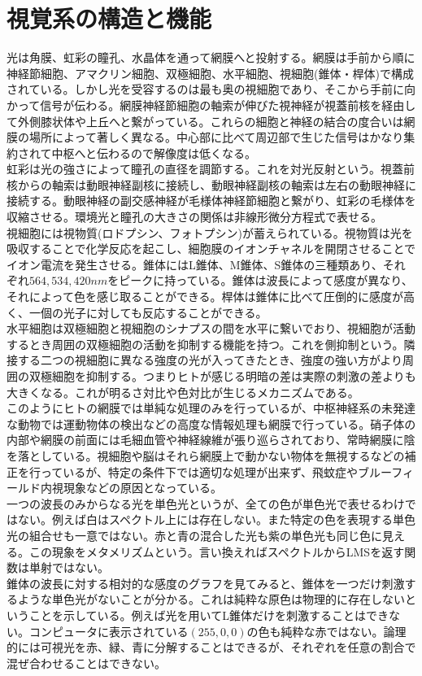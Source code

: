	\section{視覚系の構造と機能}
		光は角膜、虹彩の瞳孔、水晶体を通って網膜へと投射する。網膜は手前から順に神経節細胞、アマクリン細胞、双極細胞、水平細胞、視細胞(錐体・桿体)で構成されている。しかし光を受容するのは最も奥の視細胞であり、そこから手前に向かって信号が伝わる。網膜神経節細胞の軸索が伸びた視神経が視蓋前核を経由して外側膝状体や上丘へと繋がっている。これらの細胞と神経の結合の度合いは網膜の場所によって著しく異なる。中心部に比べて周辺部で生じた信号はかなり集約されて中枢へと伝わるので解像度は低くなる。\\
		虹彩は光の強さによって瞳孔の直径を調節する。これを対光反射という。視蓋前核からの軸索は動眼神経副核に接続し、動眼神経副核の軸索は左右の動眼神経に接続する。動眼神経の副交感神経が毛様体神経節細胞と繋がり、虹彩の毛様体を収縮させる。環境光と瞳孔の大きさの関係は非線形微分方程式で表せる。\\
		視細胞には視物質(ロドプシン、フォトプシン)が蓄えられている。視物質は光を吸収することで化学反応を起こし、細胞膜のイオンチャネルを開閉させることでイオン電流を発生させる。錐体にはL錐体、M錐体、S錐体の三種類あり、それぞれ$564, 534, 420nm$をピークに持っている。錐体は波長によって感度が異なり、それによって色を感じ取ることができる。桿体は錐体に比べて圧倒的に感度が高く、一個の光子に対しても反応することができる。\\
		水平細胞は双極細胞と視細胞のシナプスの間を水平に繋いでおり、視細胞が活動するとき周囲の双極細胞の活動を抑制する機能を持つ。これを側抑制という。隣接する二つの視細胞に異なる強度の光が入ってきたとき、強度の強い方がより周囲の双極細胞を抑制する。つまりヒトが感じる明暗の差は実際の刺激の差よりも大きくなる。これが明るさ対比や色対比が生じるメカニズムである。\\
		このようにヒトの網膜では単純な処理のみを行っているが、中枢神経系の未発達な動物では運動物体の検出などの高度な情報処理も網膜で行っている。硝子体の内部や網膜の前面には毛細血管や神経線維が張り巡らされており、常時網膜に陰を落としている。視細胞や脳はそれら網膜上で動かない物体を無視するなどの補正を行っているが、特定の条件下では適切な処理が出来ず、飛蚊症やブルーフィールド内視現象などの原因となっている。\\
		一つの波長のみからなる光を単色光というが、全ての色が単色光で表せるわけではない。例えば白はスペクトル上には存在しない。また特定の色を表現する単色光の組合せも一意ではない。赤と青の混合した光も紫の単色光も同じ色に見える。この現象をメタメリズムという。言い換えればスペクトルからLMSを返す関数は単射ではない。\\
		錐体の波長に対する相対的な感度のグラフを見てみると、錐体を一つだけ刺激するような単色光がないことが分かる。これは純粋な原色は物理的に存在しないということを示している。例えば光を用いてL錐体だけを刺激することはできない。コンピュータに表示されている$(255, 0, 0)$の色も純粋な赤ではない。論理的には可視光を赤、緑、青に分解することはできるが、それぞれを任意の割合で混ぜ合わせることはできない。\\
